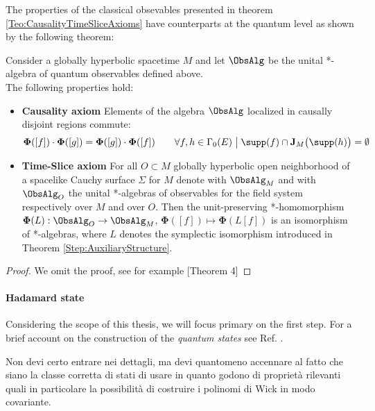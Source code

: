 \documentclass[Main]{subfiles}
\begin{document}
   			The properties of the classical obsevables presented in theorem \ref{Teo:CausalityTimeSliceAxioms} have counterparts at the quantum level as shown by the following theorem:
				\begin{theorem}\label{Teo:QuantumCausalityTimeSliceAxioms}
					Consider a globally hyperbolic spacetime $M$ and let $\ObsAlg$ be the unital *-algebra of quantum observables defined above.\\
					The following properties hold:
					\begin{itemize}
						\item \textbf{Causality axiom}
							Elements of the algebra $\ObsAlg$ localized in causally disjoint regions commute:
							\begin{displaymath}
								\mathbf{\Phi}([f]) \cdot \mathbf{\Phi}([g]) = \mathbf{\Phi}([g]) \cdot \mathbf{\Phi}([f]) \qquad 
								\forall f,h \in \Gamma_0(E) \; \big\vert \; \supp(f) \cap \textbf{J}_M \big(\supp(h) \big) = \emptyset
							\end{displaymath}
						\item \textbf{Time-Slice axiom}
							For all $O \subset M$ globally hyperbolic open neighborhood of a spacelike Cauchy surface $\Sigma$ for $M$ denote 
							with $\ObsAlg_M$ and with $\ObsAlg_O$ the unital *-algebras of observables for the field system respectively over $M$ and over $O$.
							Then the unit-preserving *-homomorphism $\mathbf{\Phi}(L):\ObsAlg_O \rightarrow \ObsAlg_M $, $ \mathbf{\Phi}([ f ]) \mapsto \mathbf{\Phi} (L[f])$ is an isomorphism of *-algebras, where $L$ denotes the symplectic isomorphism introduced in Theorem \ref{Step:AuxiliaryStructure}.
					\end{itemize}
				\end{theorem}
				\begin{proof}
					We omit the proof, see for example \cite{benini}[Theorem 4]
				\end{proof}
	
   		\paragraph{Hadamard state} 
			Considering the scope of this thesis, we will focus primary on the first step. For a brief account on the construction of the \emph{quantum states} see Ref. \cite{Benini2013}.
			\begin{Warning}
			Non devi certo entrare nei dettagli, ma devi quantomeno accennare al fatto che siano la classe corretta di stati di usare in quanto godono di proprietà rilevanti quali in particolare la possibilità di costruire i polinomi di Wick in modo covariante.
			\end{Warning}
\end{document}
